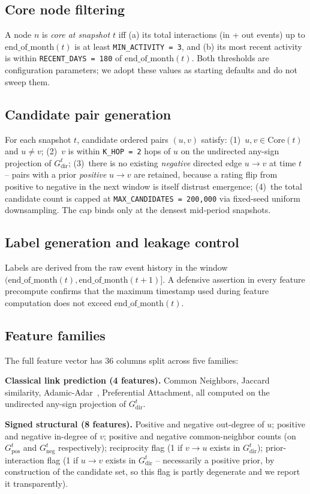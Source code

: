 \documentclass[conference]{IEEEtran}
\newcommand{\code}[1]{\texttt{#1}}
\begin{document}
\subsection{Core node filtering}
A node $n$ is \emph{core at snapshot $t$} iff (a) its total
interactions (in + out events) up to $\mathrm{end\_of\_month}(t)$ is at
least \code{MIN\_ACTIVITY = 3}, and (b) its most recent activity is
within \code{RECENT\_DAYS = 180} of $\mathrm{end\_of\_month}(t)$. Both
thresholds are configuration parameters; we adopt these values as
starting defaults and do not sweep them.

\subsection{Candidate pair generation}
For each snapshot $t$, candidate ordered pairs $(u, v)$ satisfy:
(1)~$u, v \in \mathrm{Core}(t)$ and $u \neq v$;
(2)~$v$ is within \code{K\_HOP = 2} hops of $u$ on the undirected
any-sign projection of $G^t_{\mathrm{dir}}$;
(3)~there is no existing \emph{negative} directed edge $u \to v$ at
time $t$ -- pairs with a prior \emph{positive} $u \to v$ are retained,
because a rating flip from positive to negative in the next window is
itself distrust emergence;
(4)~the total candidate count is capped at
\code{MAX\_CANDIDATES = 200{,}000} via fixed-seed uniform
downsampling. The cap binds only at the densest mid-period snapshots.

\subsection{Label generation and leakage control}
Labels are derived from the raw event history in the window
$(\mathrm{end\_of\_month}(t), \mathrm{end\_of\_month}(t{+}1)]$. A
defensive assertion in every feature precompute confirms that the
maximum timestamp used during feature computation does not exceed
$\mathrm{end\_of\_month}(t)$.

\subsection{Feature families}
The full feature vector has 36 columns split across five families:

\textbf{Classical link prediction (4 features).} Common Neighbors,
Jaccard similarity, Adamic-Adar~\cite{adamic2003}, Preferential
Attachment, all computed on the undirected any-sign projection of
$G^t_{\mathrm{dir}}$.

\textbf{Signed structural (8 features).} Positive and negative
out-degree of $u$; positive and negative in-degree of $v$; positive
and negative common-neighbor counts (on $G^t_{\mathrm{pos}}$ and
$G^t_{\mathrm{neg}}$ respectively); reciprocity flag (1 if $v \to u$
exists in $G^t_{\mathrm{dir}}$); prior-interaction flag (1 if
$u \to v$ exists in $G^t_{\mathrm{dir}}$ -- necessarily a positive
prior, by construction of the candidate set, so this flag is partly
degenerate and we report it transparently).
\end{document}
